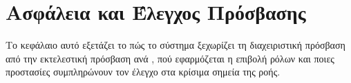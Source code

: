 \chapter{Ασφάλεια και Έλεγχος Πρόσβασης}
\label{ch:security_access}

Το κεφάλαιο αυτό εξετάζει το πώς το σύστημα ξεχωρίζει τη διαχειριστική πρόσβαση από την εκτελεστική πρόσβαση ανά , πού εφαρμόζεται η επιβολή ρόλων και ποιες  προστασίες συμπληρώνουν τον  έλεγχο στα κρίσιμα σημεία της  ροής.


